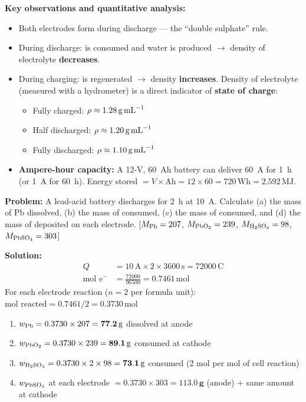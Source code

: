 \textbf{Key observations and quantitative analysis:}
\begin{itemize}
    \item Both electrodes form  during discharge --- the ``double sulphate'' rule.
    \item During discharge:  is consumed and water is produced $\to$ density of electrolyte \textbf{decreases}.
    \item During charging:  is regenerated $\to$ density \textbf{increases}. Density of electrolyte (measured with a hydrometer) is a direct indicator of \textbf{state of charge}:
    \begin{itemize}
        \item Fully charged: $\rho \approx 1.28\,\text{g\,mL}^{-1}$
        \item Half discharged: $\rho \approx 1.20\,\text{g\,mL}^{-1}$
        \item Fully discharged: $\rho \approx 1.10\,\text{g\,mL}^{-1}$
    \end{itemize}
    \item \textbf{Ampere-hour capacity:} A 12-V, 60~Ah battery can deliver 60~A for 1~h (or 1~A for 60~h). Energy stored $= V \times\text{Ah} = 12 \times 60 = 720\,\text{Wh} = 2.592\,\text{MJ}$.
\end{itemize}

\begin{examplebox}
\textbf{Problem:} A lead-acid battery discharges for 2~h at 10~A. Calculate (a) the mass of Pb dissolved, (b) the mass of  consumed, (c) the mass of  consumed, and (d) the mass of  deposited on each electrode. [$M_{\ce{Pb}}=207$, $M_{\ce{PbO2}}=239$, $M_{\ce{H2SO4}}=98$, $M_{\ce{PbSO4}}=303$]

\textbf{Solution:}
\begin{align*}
Q &= 10\,\text{A} \times 2 \times 3600\,\text{s} = 72000\,\text{C}\\
\text{mol e}^- &= \frac{72000}{96500} = 0.7461\,\text{mol}
\end{align*}
For each electrode reaction ($n=2$ per formula unit):
$\text{mol reacted} = 0.7461/2 = 0.3730\,\text{mol}$

\begin{enumerate}
    \item $w_{\ce{Pb}} = 0.3730 \times 207 = \mathbf{77.2\,\text{g}}$ dissolved at anode
    \item $w_{\ce{PbO2}} = 0.3730 \times 239 = \mathbf{89.1\,\text{g}}$ consumed at cathode
    \item $w_{\ce{H2SO4}} = 0.3730 \times 2 \times 98 = \mathbf{73.1\,\text{g}}$ consumed (2 mol per mol of cell reaction)
    \item $w_{\ce{PbSO4}}$ at each electrode $= 0.3730 \times 303 = \mathbf{113.0\,\text{g}}$ (anode) + same amount at cathode
\end{enumerate}
\end{examplebox}


